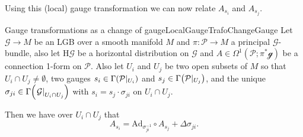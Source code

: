 \documentclass[reqno,a4paper,oneside]{amsart}
\theoremstyle{plain}
\theoremstyle{remark}
\theoremstyle{definition}
\begin{document}
Using this (local) gauge transformation we can now relate $A_{s_i}$ and $A_{s_j}$.

\begin{propositions}{Gauge transformations as a change of gauge}{LocalGaugeTrafoChangeGauge}
Let $\mathcal{G} \to M$ be an LGB over a smooth manifold $M$ and $\pi\colon\mathcal{P} \to M$ a principal $\mathcal{G}$-bundle, also let $\mathrm{H}\mathcal{G}$ be a horizontal distribution on $\mathcal{G}$ and $A \in \Omega^1(\mathcal{P}; \pi^*\mathcal{g})$ be a connection 1-form on $\mathcal{P}$. Also let $U_i$ and $U_j$ be two open subsets of $M$ so that $U_i \cap U_j \neq \emptyset$, two gauges $s_i \in \Gamma\mleft(\mathcal{P}|_{U_i}\mright)$ and $s_j \in \Gamma\mleft(\mathcal{P}|_{U_j}\mright)$, and the unique $\sigma_{ji} \in \Gamma\mleft( \mleft.\mathcal{G}\mright|_{U_i \cap U_j} \mright)$ with $s_i = s_j \cdot \sigma_{ji}$ on $U_i \cap U_j$.

Then we have over $U_i \cap U_j$ that
\begin{equation*}
A_{s_i}
=
\mathrm{Ad}_{\sigma_{ji}^{-1}}\circ A_{s_j}
	+ \Delta\sigma_{ji}.
\end{equation*}
\end{propositions}
\end{document}
